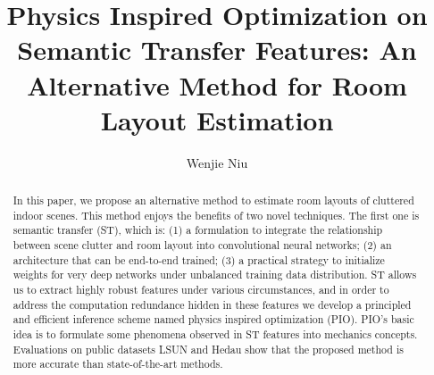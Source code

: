 \documentclass[10pt,twocolumn,letterpaper]{article}
\begin{document}
\title{Physics Inspired Optimization on Semantic Transfer Features: An Alternative Method for Room Layout Estimation}
\author{Wenjie Niu}
\maketitle

\begin{abstract}
   In this paper, we propose an alternative method to estimate
room layouts of cluttered indoor scenes. This method
enjoys the benefits of two novel techniques. The first one
is semantic transfer (ST), which is: (1) a formulation to
integrate the relationship between scene clutter and room
layout into convolutional neural networks; (2) an architecture
that can be end-to-end trained; (3) a practical strategy
to initialize weights for very deep networks under unbalanced
training data distribution. ST allows us to extract
highly robust features under various circumstances,
and in order to address the computation redundance hidden
in these features we develop a principled and efficient inference
scheme named physics inspired optimization (PIO).
PIO’s basic idea is to formulate some phenomena observed
in ST features into mechanics concepts. Evaluations on
public datasets LSUN and Hedau show that the proposed
method is more accurate than state-of-the-art methods.~\cite{Zhao_2017_CVPR}
\end{abstract}
\end{document}
